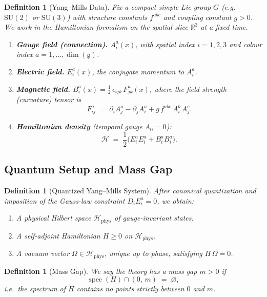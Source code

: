 \documentclass[11pt]{article}
\newtheorem{definition}[theorem]{Definition}
\DeclareMathOperator{\spec}{spec}
\begin{document}
\begin{definition}[Yang--Mills Data]
\label{def:ym-data}
Fix a compact simple Lie group $G$ (e.g.\ $\mathrm{SU}(2)$ or
$\mathrm{SU}(3)$) with structure constants $f^{abc}$ and coupling
constant $g > 0$.  We work in the Hamiltonian formalism on the spatial
slice $\mathbb{R}^3$ at a fixed time.

\begin{enumerate}
\item \textbf{Gauge field (connection).}
      $A_i^a(x)$, with spatial index $i = 1,2,3$ and colour index
      $a = 1,\ldots, \dim(\mathfrak{g})$.
\item \textbf{Electric field.}
      $E_i^a(x)$, the conjugate momentum to $A_i^a$.
\item \textbf{Magnetic field.}
      $B_i^a(x) = \tfrac{1}{2}\,\epsilon_{ijk}\,F_{jk}^a(x)$, where
      the field-strength (curvature) tensor is
      \[
        F_{ij}^a
        \;=\;
        \partial_i A_j^a - \partial_j A_i^a
        + g\,f^{abc}\,A_i^b\,A_j^c .
      \]
\item \textbf{Hamiltonian density} (temporal gauge $A_0 = 0$):
      \[
        \mathcal{H}
        \;=\;
        \frac{1}{2}\!\bigl(E_i^a E_i^a + B_i^a B_i^a\bigr).
      \]
\end{enumerate}
\end{definition}

\subsection{Quantum Setup and Mass Gap}

\begin{definition}[Quantized Yang--Mills System]
\label{def:ym-quantum}
After canonical quantization and imposition of the Gauss-law constraint
$D_i E_i^a = 0$, we obtain:
\begin{enumerate}
\item A \emph{physical Hilbert space} $\mathcal{H}_{\mathrm{phys}}$
      of gauge-invariant states.
\item A self-adjoint \emph{Hamiltonian}
      $H \geq 0$ on $\mathcal{H}_{\mathrm{phys}}$.
\item A \emph{vacuum vector} $\Omega \in \mathcal{H}_{\mathrm{phys}}$,
      unique up to phase, satisfying $H\,\Omega = 0$.
\end{enumerate}
\end{definition}

\begin{definition}[Mass Gap]
\label{def:mass-gap}
We say the theory has a \emph{mass gap} $m > 0$ if
\[
  \spec(H) \cap (0,\,m) \;=\; \varnothing ,
\]
i.e.\ the spectrum of $H$ contains no points strictly between $0$ and
$m$.
\end{definition}
\end{document}
